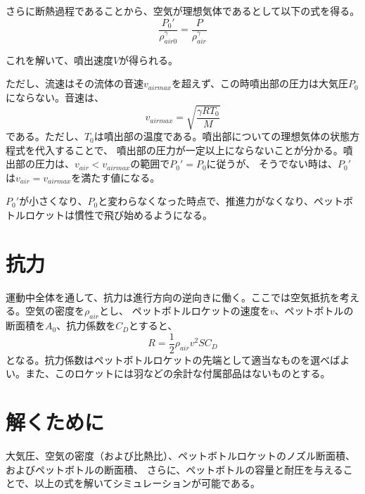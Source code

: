 \documentclass{article}
\begin{document}
さらに断熱過程であることから、空気が理想気体であるとして以下の式を得る。
\begin{equation}
\frac{P_0'}{\rho_{air0}^\gamma} = \frac{P}{\rho_{air}^\gamma}
\end{equation}

これを解いて、噴出速度$V$が得られる。

ただし、流速はその流体の音速$v_{airmax}$を超えず、この時噴出部の圧力は大気圧$P_0$にならない。音速は、
\begin{equation}
v_{airmax} = \sqrt{\frac{\gamma R T_0}{M}}
\end{equation}
である。ただし、$T_0$は噴出部の温度である。噴出部についての理想気体の状態方程式を代入することで、
噴出部の圧力が一定以上にならないことが分かる。噴出部の圧力は、$v_{air} < v_{airmax}$の範囲で$P_0'=P_0$に従うが、
そうでない時は、$P_0'$は$v_{air} = v_{airmax}$を満たす値になる。

$P_0'$が小さくなり、$P_0$と変わらなくなった時点で、推進力がなくなり、ペットボトルロケットは慣性で飛び始めるようになる。

\section{ 抗力 }

運動中全体を通して、抗力は進行方向の逆向きに働く。ここでは空気抵抗を考える。空気の密度を$\rho_{air}$とし、
ペットボトルロケットの速度を$v$、ペットボトルの断面積を$A_0$、抗力係数を$C_D$とすると、
\begin{equation}
R = \frac{1}{2}\rho_{air}v^2 S C_D
\end{equation}
となる。抗力係数はペットボトルロケットの先端として適当なものを選べばよい。また、このロケットには羽などの余計な付属部品はないものとする。

\section{ 解くために }

大気圧、空気の密度（および比熱比）、ペットボトルロケットのノズル断面積、およびペットボトルの断面積、
さらに、ペットボトルの容量と耐圧を与えることで、以上の式を解いてシミュレーションが可能である。
\end{document}
